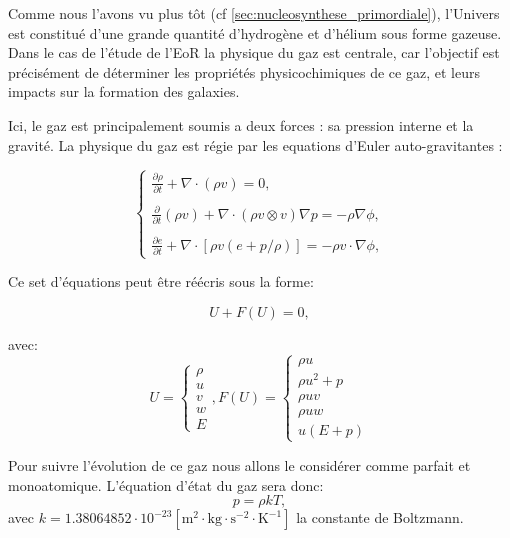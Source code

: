 Comme nous l'avons vu plus tôt (cf \ref{sec:nucleosynthese_primordiale}), l'Univers est constitué d'une grande quantité d'hydrogène et d'hélium sous forme gazeuse.
Dans le cas de l'étude de l'\ac{EoR} la physique du gaz est centrale, car l'objectif est précisément de déterminer les propriétés physicochimiques de ce gaz, et leurs impacts sur la formation des galaxies.

Ici, le gaz est principalement soumis a deux forces : sa pression interne et la gravité.
La physique du gaz est régie par les equations d'Euler auto-gravitantes :

\begin{equation}
\begin{cases}

{ \frac{ \partial \rho }{ \partial t } + \nabla \cdot (\rho v) = 0}, \\
\\
{ \frac{ \partial }{ \partial t } (\rho v) + \nabla \cdot (\rho v \otimes v ) \nabla p = -\rho\nabla \phi }, \\
\\
{ \frac{ \partial e }{ \partial t } + \nabla \cdot [ \rho v (e+p/\rho) ] = -\rho v \cdot \nabla \phi },

\end{cases}
\end{equation}
\label{eq:hydro}

Ce set d'équations peut être réécris sous la forme:

\begin{equation}
U+F(U) = 0,
\end{equation}

avec:
\begin{equation}
U=
\begin{cases}
{ \rho}\\
{ u}\\
{ v}\\
{ w}\\
{ E}
\end{cases}
,
F(U)=
\begin{cases}
{ \rho u}\\
{ \rho u^2+p}\\
{ \rho uv}\\
{ \rho uw}\\
{ u(E+p)}
\end{cases}
\end{equation}

Pour suivre l'évolution de ce gaz nous allons le considérer comme parfait et monoatomique.
L’équation d'état du gaz sera donc:
\begin{equation}
p=\rho k T, 
\end{equation}
avec $k=1.38064852 \cdot 10^{-23} \left[ \mathrm{m^2 \cdot kg \cdot s^{-2} \cdot K^{-1}} \right] $ la constante de Boltzmann.


